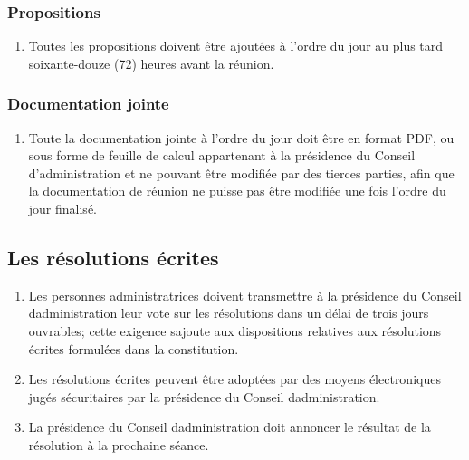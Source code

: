 \subsubsection{Propositions}
\label{reunion-conseil-motions}

\begin{enumerate}
 \item
  Toutes les propositions doivent être ajoutées à l’ordre du jour au plus tard soixante-douze (72) heures avant la réunion.
\end{enumerate}

\subsubsection{Documentation jointe}
\label{reunion-conseil-documentation-jointe}

\begin{enumerate}
 \item
  Toute la documentation jointe à l’ordre du jour doit être en format PDF, ou sous forme de feuille de calcul appartenant à la présidence du Conseil d’administration et ne pouvant être modifiée par des tierces parties, afin que la documentation de réunion ne puisse pas être modifiée une fois l’ordre du jour finalisé.
\end{enumerate}

\subsection{Les résolutions écrites}
\label{les-resolutions-ecrites}

\begin{enumerate}
 \item
  Les personnes administratrices doivent transmettre à la présidence du Conseil d\textquotesingle administration leur vote sur les résolutions dans un délai de trois jours ouvrables; cette exigence s\textquotesingle ajoute aux dispositions relatives aux résolutions écrites formulées dans la constitution.
 \item
  Les résolutions écrites peuvent être adoptées par des moyens électroniques jugés sécuritaires par la présidence du Conseil d\textquotesingle administration.
 \item
  La présidence du Conseil d\textquotesingle administration doit annoncer le résultat de la résolution à la prochaine séance.
\end{enumerate}

